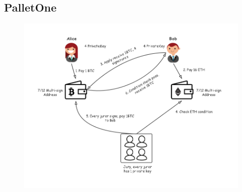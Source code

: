 












\subsection{PalletOne}
\noindent
\begin{figure}[H]
    \includegraphics[width=1\textwidth]{./figures/jury.png}
    \centering
    \caption{ \protect\footnotemark}
    \centering
\end{figure}
